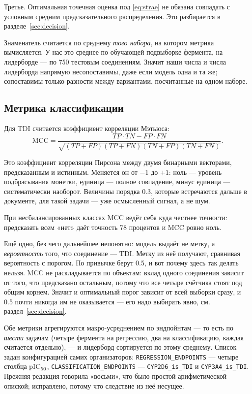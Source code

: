 Третье. Оптимальная точечная оценка под \eqref{eq:strae} не обязана совпадать с условным средним
предсказательного распределения. Это разбирается в разделе~\ref{sec:decision}.

Знаменатель считается по среднему \emph{того набора}, на котором метрика вычисляется. У нас это среднее
по обучающей подвыборке фермента, на лидерборде --- по 750 тестовым соединениям. Значит наши числа и числа
лидерборда напрямую несопоставимы, даже если модель одна и та же; сопоставимы только разности между
вариантами, посчитанные на одном наборе.

\subsection{Метрика классификации}

Для TDI считается коэффициент корреляции Мэтьюса:
\begin{equation}
\text{MCC} = \frac{TP\cdot TN - FP\cdot FN}{\sqrt{(TP+FP)(TP+FN)(TN+FP)(TN+FN)}} .
\label{eq:mcc}
\end{equation}

Это коэффициент корреляции Пирсона между двумя бинарными векторами, предсказанным и истинным.
Меняется он от $-1$ до $+1$: ноль --- уровень подбрасывания монетки, единица --- полное
совпадение, минус единица --- систематически наоборот. Величины порядка 0.3, которые
встречаются дальше в документе, для такой задачи --- уже осмысленный сигнал, а не шум.

При несбалансированных классах MCC ведёт себя куда честнее точности: предсказать всем «нет»
даёт точность 78 процентов и MCC ровно ноль.

Ещё одно, без чего дальнейшее непонятно: модель выдаёт не метку, а \emph{вероятность} того,
что соединение --- TDI. Метку из неё получают, сравнивая вероятность с порогом. По привычке
берут 0.5, и вот почему здесь так делать нельзя. MCC не раскладывается по объектам: вклад
одного соединения зависит от того, что предсказано остальным, потому что все четыре счётчика
стоят под общим корнем. Значит и оптимальный порог зависит от всей выборки сразу, и 0.5 почти
никогда им не оказывается --- его надо выбирать явно, см. раздел~\ref{sec:decision}.

Обе метрики агрегируются макро-усреднением по эндпойнтам --- то есть по \emph{шести} задачам
(четыре фермента на регрессию, два на классификацию, каждая считается отдельно), --- и
лидерборд сортируется по этому среднему. Список задан конфигурацией самих организаторов:
\texttt{REGRESSION\_ENDPOINTS} --- четыре столбца $\mathrm{pIC}_{50}$, \texttt{CLASSIFICATION\_ENDPOINTS} ---
\texttt{CYP2D6\_is\_TDI} и \texttt{CYP3A4\_is\_TDI}. Прежняя редакция говорила «восьми», что
было простой арифметической опиской; исправлено, потому что следствие из неё несущее.

